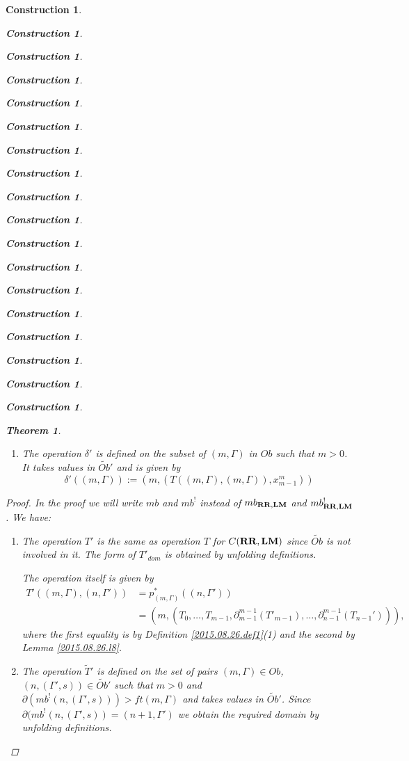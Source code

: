 \documentclass[onecolumn,12pt]{amsart}
\newtheorem{theorem}[proposition]{Theorem}
\numberwithin{proposition}{subsection}
\newtheorem{construction}[proposition]{Construction}
\newcommand{\wt}{\widetilde}
\newcommand{\RR}{{\bf RR}}
\newcommand{\LM}{{\bf LM}}
\begin{document}
\begin{construction}
\begin{construction}
\begin{construction}
\begin{construction}
\begin{construction}
\begin{construction}
\begin{construction}
\begin{construction}
\begin{construction}
\begin{construction}
\begin{construction}
\begin{construction}
\begin{construction}
\begin{construction}
\begin{construction}
\begin{construction}
\begin{construction}
\begin{construction}
\begin{theorem}
\begin{enumerate}
$$\wt{S}'((m,(\Gamma,r)),(n,(\Gamma',s))):=(n-1,(S'((m,(\Gamma,r)),(n+1,\Gamma'))),\theta_{m,n}(r,s))$$
%
\item The operation $\delta'$ is defined on the subset of $(m,\Gamma)$ in $Ob$ such
  that $m>0$. It takes values in $\wt{Ob}'$ and is given by
%
$$\delta'((m,\Gamma)):=(m,(T((m,\Gamma),(m,\Gamma)),x_{m-1}^m))$$
%
\end{enumerate}
\end{theorem}
%
\begin{proof}
In the proof we will write $mb$ and $mb^!$ instead of $mb_{\RR,\LM}$ and
$mb^!_{\RR,\LM}$. We have:
%
\begin{enumerate}
%
\item The operation $T'$ is the same as operation $T$ for $C(\RR,\LM)$ since
  $\wt{Ob}$ is not involved in it. The form of $T'_{dom}$ is obtained by
  unfolding definitions.

The operation itself is given by 
\begin{equation*}
  \begin{split}
    T'((m,\Gamma),(n,\Gamma'))&=p_{(m,\Gamma)}^*((n,\Gamma'))\\
    &=(m,(T_0,\dots,T_{m-1},\partial_{m-1}^{m-1}(T'_{m-1}),\dots, \partial_{n-1}^{m-1}(T_{n-1}'))),
  \end{split}
\end{equation*}
where the first equality is by Definition \ref{2015.08.26.def1}(1) and the second by Lemma \ref{2015.08.26.l8}. 
%
\item The operation $\wt{T}'$ is defined on the set of pairs $(m,\Gamma)\in Ob$,
  $(n,(\Gamma',s))\in \wt{Ob}'$ such that $m>0$ and
  $\partial(mb^!(n,(\Gamma',s)))>ft(m,\Gamma)$ and takes values in
  $\wt{Ob}'$. Since $\partial(mb^!(n,(\Gamma',s))=(n+1,\Gamma')$ we obtain the
  required domain by unfolding definitions.


\end{enumerate}
\end{proof}
\end{construction}
\end{construction}
\end{construction}
\end{construction}
\end{construction}
\end{construction}
\end{construction}
\end{construction}
\end{construction}
\end{construction}
\end{construction}
\end{construction}
\end{construction}
\end{construction}
\end{construction}
\end{construction}
\end{construction}
\end{construction}
\end{document}
